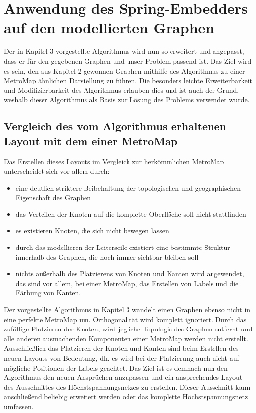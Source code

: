 
\chapter{Anwendung des Spring-Embedders auf den modellierten Graphen}
\label{Kapitel 4}
%

Der in Kapitel 3 vorgestellte Algorithmus wird nun so erweitert und angepasst, dass er für den gegebenen Graphen und unser Problem passend ist. Das Ziel wird es sein, den aus Kapitel 2 gewonnen Graphen mithilfe des Algorithmus zu einer MetroMap ähnlichen Darstellung zu führen. Die besonders leichte Erweiterbarkeit und Modifizierbarkeit des Algorithmus erlauben dies und ist auch der Grund, weshalb dieser Algorithmus als Basis zur Lösung des Problems verwendet wurde. \\

\section{Vergleich des vom Algorithmus erhaltenen Layout mit dem einer MetroMap}
\label{Kapitel_4_-_Unterkapitel_2}

Das Erstellen dieses Layouts im Vergleich zur herkömmlichen MetroMap unterscheidet sich vor allem durch:

\begin{itemize}
	\item eine deutlich striktere Beibehaltung der topologischen und geographischen Eigenschaft des Graphen
	\item das Verteilen der Knoten auf die komplette Oberfläche soll nicht stattfinden
	\item es existieren Knoten, die sich nicht bewegen lassen
	\item durch das modellieren der Leiterseile existiert eine bestimmte Struktur innerhalb des Graphen, die noch immer sichtbar bleiben soll
	\item nichts außerhalb des Platzierens von Knoten und Kanten wird angewendet, das sind vor allem, bei einer MetroMap, das Erstellen von Labels und die Färbung von Kanten.
\end{itemize} 

Der vorgestellte Algorithmus in Kapitel 3 wandelt einen Graphen ebenso nicht in eine perfekte MetroMap um. Orthogonalität wird komplett ignoriert. Durch das zufällige Platzieren der Knoten, wird jegliche Topologie des Graphen entfernt und alle anderen ausmachenden Komponenten einer MetroMap werden nicht erstellt. Ausschließlich das Platzieren der Knoten und Kanten sind beim Erstellen des neuen Layouts von Bedeutung, dh. es wird bei der Platzierung auch nicht auf mögliche Positionen der Labels geachtet. Das Ziel ist es demnach nun den Algorithmus den neuen Ansprüchen anzupassen und ein ansprechendes Layout des Ausschnittes des Höchstspannungsnetzes zu erstellen. Dieser Ausschnitt  kann anschließend beliebig erweitert werden oder das komplette Höchstspannungsnetz umfassen.  


